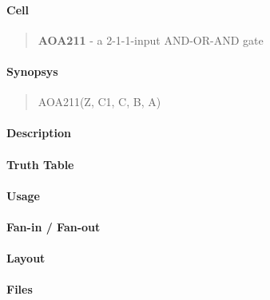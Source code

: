 \label{AOA211}
\paragraph{Cell}
\begin{quote}
    \textbf{AOA211} - a 2-1-1-input AND-OR-AND gate
\end{quote}

\paragraph{Synopsys}
\begin{quote}
    AOA211(Z, C1, C, B, A)
\end{quote}

\paragraph{Description}

%

\paragraph{Truth Table}
%

\paragraph{Usage}

\paragraph{Fan-in / Fan-out}

\paragraph{Layout}

\paragraph{Files}
